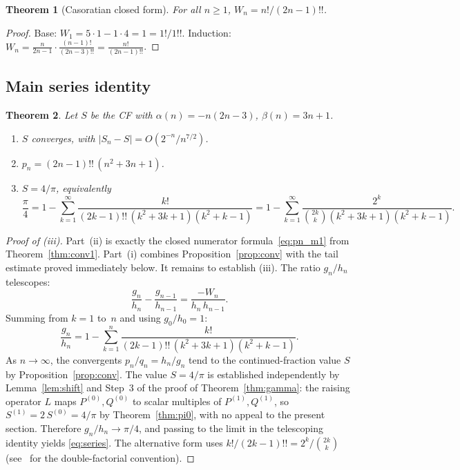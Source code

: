 \documentclass[11pt,a4paper]{article}
\theoremstyle{plain}
\newtheorem{theorem}{Theorem}[section]
\theoremstyle{definition}
\theoremstyle{remark}
\newcommand{\dff}[1]{(#1)!!}
\begin{document}
\begin{theorem}[Casoratian closed form]\label{thm:cas}
For all $n \geq 1$,
$W_n = n!/\dff{2n{-}1}$.
\end{theorem}

\begin{proof}
Base: $W_1 = 5\cdot 1 - 1\cdot 4 = 1 = 1!/1!!$.
Induction:
$W_n = \frac{n}{2n{-}1}\cdot\frac{(n{-}1)!}{\dff{2n{-}3}}
= \frac{n!}{\dff{2n{-}1}}$.
\end{proof}

\subsection{Main series identity}

\begin{theorem}\label{thm:4overpi}
Let $S$ be the CF with $\alpha(n) = -n(2n{-}3)$,
$\beta(n) = 3n{+}1$.
\begin{enumerate}
\item[\textup{(i)}]
  $S$ converges, with $|S_n - S| = O(2^{-n}/n^{7/2})$.
\item[\textup{(ii)}]
  $p_n = \dff{2n{-}1}\,(n^2{+}3n{+}1)$.
\item[\textup{(iii)}]
  $S = 4/\pi$, equivalently
\begin{equation}\label{eq:series}
  \frac{\pi}{4}
  = 1 - \sum_{k=1}^{\infty}
    \frac{k!}{\dff{2k{-}1}\,(k^2{+}3k{+}1)(k^2{+}k{-}1)}
  = 1 - \sum_{k=1}^{\infty}
    \frac{2^k}{\binom{2k}{k}(k^2{+}3k{+}1)(k^2{+}k{-}1)}.
\end{equation}
\end{enumerate}
\end{theorem}

\begin{proof}[Proof of \textup{(iii)}]
Part~\textup{(ii)} is exactly the closed numerator formula~\eqref{eq:pn_m1}
from Theorem~\ref{thm:conv1}. Part~\textup{(i)} combines
Proposition~\ref{prop:conv} with the tail estimate proved immediately below.
It remains to establish \textup{(iii)}. The ratio $g_n/h_n$ telescopes:
\[
  \frac{g_n}{h_n} - \frac{g_{n-1}}{h_{n-1}}
  = \frac{-W_n}{h_n\,h_{n-1}}.
\]
Summing from $k = 1$ to~$n$ and using $g_0/h_0 = 1$:
\[
  \frac{g_n}{h_n}
  = 1 - \sum_{k=1}^{n}
    \frac{k!}{\dff{2k{-}1}\,(k^2{+}3k{+}1)(k^2{+}k{-}1)}.
\]
As $n\to\infty$, the convergents $p_n/q_n = h_n/g_n$ tend to the
continued-fraction value $S$ by Proposition~\ref{prop:conv}.
The value $S = 4/\pi$ is established independently by
Lemma~\ref{lem:shift} and Step~3 of the proof of
Theorem~\ref{thm:gamma}: the raising operator $L$ maps
$P^{(0)},Q^{(0)}$ to scalar multiples of $P^{(1)},Q^{(1)}$, so
$S^{(1)} = 2\,S^{(0)} = 4/\pi$ by Theorem~\ref{thm:pi0}, with no
appeal to the present section. Therefore $g_n/h_n \to \pi/4$, and
passing to the limit in the telescoping identity yields
\eqref{eq:series}. The alternative form uses
$k!/\dff{2k{-}1} = 2^k/\binom{2k}{k}$
(see~\cite[\S1.2.6]{knuth1997} for the double-factorial convention).
\end{proof}
\end{document}
